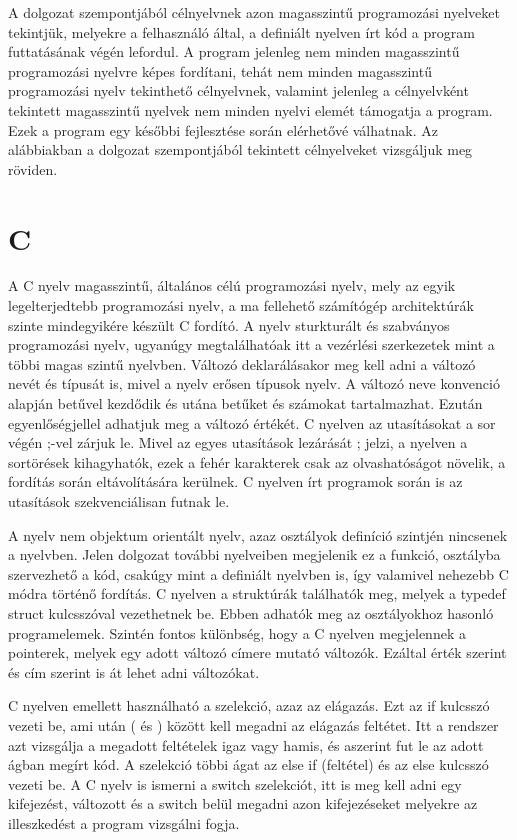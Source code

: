 
A dolgozat szempontjából célnyelvnek azon magasszintű programozási nyelveket tekintjük, melyekre a felhasználó által, a definiált nyelven írt kód a program futtatásának végén lefordul. A program jelenleg nem minden magasszintű programozási nyelvre képes fordítani, tehát nem minden magasszintű programozási nyelv tekinthető célnyelvnek, valamint jelenleg a célnyelvként tekintett magasszintű nyelvek nem minden nyelvi elemét támogatja a program. Ezek a program egy későbbi fejlesztése során elérhetővé válhatnak. Az alábbiakban a dolgozat szempontjából tekintett célnyelveket vizsgáljuk meg röviden.

\section{C}

A C nyelv magasszintű, általános célú programozási nyelv, mely az egyik legelterjedtebb programozási nyelv, a ma fellehető számítógép architektúrák szinte mindegyikére készült C fordító. A nyelv sturkturált és szabványos programozási nyelv, ugyanúgy megtalálhatóak itt a vezérlési szerkezetek mint a többi magas szintű nyelvben. Változó deklarálásakor meg kell adni a változó nevét és típusát is, mivel a nyelv erősen típusok nyelv. A változó neve konvenció alapján betűvel kezdődik és utána betűket és számokat tartalmazhat. Ezután egyenlőségjellel adhatjuk meg a változó értékét. C nyelven az utasításokat a sor végén ;-vel zárjuk le. Mivel az egyes utasítások lezárását ; jelzi, a nyelven a sortörések kihagyhatók, ezek a fehér karakterek csak az olvashatóságot növelik, a fordítás során eltávolítására kerülnek. C nyelven írt programok során is az utasítások szekvenciálisan futnak le.

A nyelv nem objektum orientált nyelv, azaz osztályok definíció szintjén nincsenek a nyelvben. Jelen dolgozat további nyelveiben megjelenik ez a funkció, osztályba szervezhető a kód, csakúgy mint a definiált nyelvben is, így valamivel nehezebb C módra történő fordítás. C nyelven a struktúrák találhatók meg, melyek a typedef struct kulcsszóval vezethetnek be. Ebben adhatók meg az osztályokhoz hasonló programelemek. Szintén fontos különbség, hogy a C nyelven megjelennek a pointerek, melyek egy adott változó címere mutató változók. Ezáltal érték szerint és cím szerint is át lehet adni változókat.

C nyelven emellett használható a szelekció, azaz az elágazás. Ezt az if kulcsszó vezeti be, ami után ( és ) között kell megadni az elágazás feltétet. Itt a rendszer azt vizsgálja a megadott feltételek igaz vagy hamis, és aszerint fut le az adott ágban megírt kód. A szelekció többi ágat az else if (feltétel) és az else kulcsszó vezeti be. A C nyelv is ismerni a switch szelekciót, itt is meg kell adni egy kifejezést, változott és a switch belül megadni azon kifejezéseket melyekre az illeszkedést a program vizsgálni fogja.

